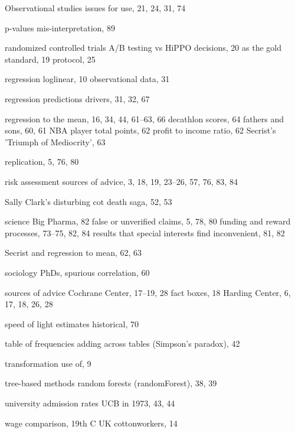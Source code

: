 \documentclass[
  10ptls,
  b5paper]{book}
\begin{document}
\begin{theindex}
  \indexspace

  \item Observational studies
    \subitem issues for use, 21, 24, 31, 74

  \indexspace

  \item p-values
    \subitem mis-interpretation, 89

  \indexspace

  \item randomized controlled trials
    \subitem A/B testing vs HiPPO decisions, 20
    \subitem as the gold standard, 19
    \subitem protocol, 25
  \item regression
    \subitem loglinear, 10
    \subitem observational data, 31
  \item regression predictions
    \subitem drivers, 31, 32, 67
  \item regression to the mean, 16, 34, 44, 61--63, 66
    \subitem decathlon scores, 64
    \subitem fathers and sons, 60, 61
    \subitem NBA player total points, 62
    \subitem profit to income ratio, 62
    \subitem Secrist's 'Triumph of Mediocrity', 63
  \item replication, 5, 76, 80
  \item risk assessment
    \subitem sources of advice, 3, 18, 19, 23--26, 57, 76, 83, 84

  \indexspace

  \item Sally Clark's disturbing cot death saga, 52, 53
  \item science
    \subitem Big Pharma, 82
    \subitem false or unverified claims, 5, 78, 80
    \subitem funding and reward processes, 73--75, 82, 84
    \subitem results that special interests find inconvenient, 81, 82
  \item Secrist and regression to mean, 62, 63
  \item sociology PhDs, spurious correlation, 60
  \item sources of advice
    \subitem Cochrane Center, 17--19, 28
    \subitem fact boxes, 18
    \subitem Harding Center, 6, 17, 18, 26, 28
  \item speed of light estimates
    \subitem historical, 70

  \indexspace

  \item table of frequencies
    \subitem adding across tables (Simpson's paradox), 42
  \item transformation
    \subitem use of, 9
  \item tree-based methods
    \subitem random forests (randomForest), 38, 39

  \indexspace

  \item university admission rates
    \subitem UCB in 1973, 43, 44

  \indexspace

  \item wage comparison, 19th C UK cottonworkers, 14

\end{theindex}
\end{document}
